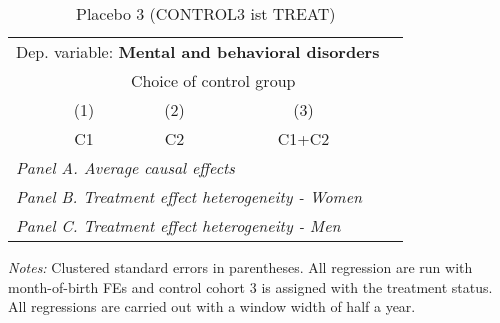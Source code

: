  \begin{table}[H] \centering \begin{threeparttable} \caption{Placebo 3 (CONTROL3 ist TREAT) } {\def\sym#1{\ifmmode^{#1}\else\(^{#1}\)\fi} \begin{tabular}{l*{4}{c}} \toprule \multicolumn{4}{l}{Dep. variable: \textbf{Mental and behavioral disorders}} \\ & \multicolumn{3}{c}{Choice of control group} \\ \cmidrule(lr){2-4}
            &\multicolumn{1}{c}{(1)}&\multicolumn{1}{c}{(2)}&\multicolumn{1}{c}{(3)}\\
            &\multicolumn{1}{c}{C1}&\multicolumn{1}{c}{C2}&\multicolumn{1}{c}{C1+C2}\\
\midrule
 \multicolumn{4}{l}{\emph{Panel A. Average causal effects}} \\      \midrule\multicolumn{4}{l}{\emph{Panel B. Treatment effect heterogeneity - Women}} \\      \midrule\multicolumn{4}{l}{\emph{Panel C. Treatment effect heterogeneity - Men}} \\      
\bottomrule \end{tabular} } \begin{tablenotes} \item \scriptsize \emph{Notes:} Clustered standard errors in parentheses. All regression are run with month-of-birth FEs and control cohort 3 is assigned with the treatment status. All regressions are carried out with a window width of half a year. \end{tablenotes} \end{threeparttable} \end{table} 
